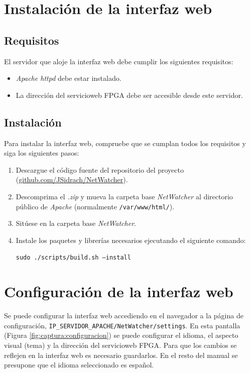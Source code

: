 \section{Instalación de la interfaz web\label{extra:manual:instalacionweb}}

\subsection*{Requisitos}
El servidor que aloje la interfaz web debe cumplir los siguientes requisitos:
\begin{itemize}
  \item \textit{Apache httpd} \cite{httpd} debe estar instalado.
  \item La dirección del \gls{servicioweb} \gls{FPGA} debe ser accesible desde este servidor.
\end{itemize}

\subsection*{Instalación}
Para instalar la interfaz web, compruebe que se cumplan todos los requisitos y siga los siguientes pasos:
\begin{enumerate}
  \item Descargue el código fuente del repositorio del proyecto (\href{https://github.com/JSidrach/NetWatcher/archive/master.zip}{\footnotesize{github.com/JSidrach/NetWatcher}}).
  \item Descomprima el \textit{.zip} y mueva la carpeta base \textit{NetWatcher} al directorio público de \textit{Apache} (normalmente \texttt{/var/www/html/}).
  \item Sitúese en la carpeta base \textit{NetWatcher}.
  \item Instale los paquetes y librerías necesarios ejecutando el siguiente comando:

  \texttt{sudo ./scripts/build.sh --install}
\end{enumerate}


\section{Configuración de la interfaz web\label{extra:manual:configweb}}

Se puede configurar la interfaz web accediendo en el navegador a la página de configuración, \texttt{IP\_SERVIDOR\_APACHE/NetWatcher/settings}. En esta pantalla (Figura \ref{fig:captura:configuracion}) se puede configurar el idioma, el aspecto visual (tema) y la dirección del \gls{servicioweb} \gls{FPGA}. Para que los cambios se reflejen en la interfaz web es necesario guardarlos. En el resto del manual se presupone que el idioma seleccionado es español.

